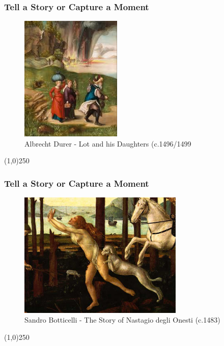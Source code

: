 \begin{frame}
\frametitle{Tell a Story or Capture a Moment}
\begin{figure}
	\centering
		\includegraphics[height=6cm]{img/candc/DurerLotandDaughters.jpg}
	\caption{Albrecht Durer - Lot and his Daughters (c.1496/1499}
	\label{fig:DurerLotAndDaughters}
\end{figure}
\end{frame}
\begin{center}\line(1,0){250}\end{center}




\begin{frame}
\frametitle{Tell a Story or Capture a Moment}
\begin{figure}
	\centering
		\includegraphics[height=6cm]{img/candc/nastag12.jpg}
	\caption{Sandro Botticelli - The Story of Nastagio degli Onesti (c.1483)}
	\label{fig:BotticelliNastagio}
\end{figure}
\end{frame}
\begin{center}\line(1,0){250}\end{center}



